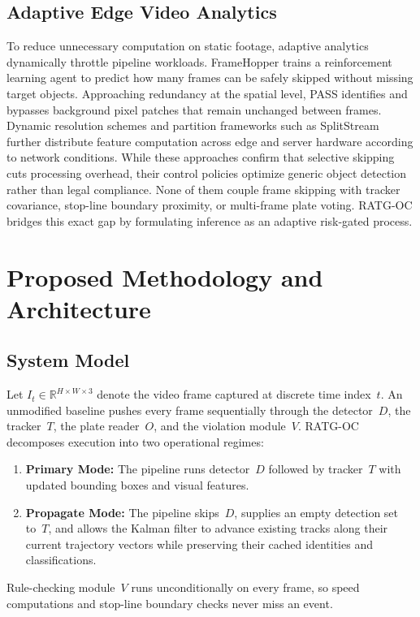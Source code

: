 \subsection{Adaptive Edge Video Analytics}
To reduce unnecessary computation on static footage, adaptive analytics dynamically throttle pipeline workloads. FrameHopper \cite{basalamah2022framehopper} trains a reinforcement learning agent to predict how many frames can be safely skipped without missing target objects. Approaching redundancy at the spatial level, PASS \cite{zhou2023pass} identifies and bypasses background pixel patches that remain unchanged between frames. Dynamic resolution schemes \cite{li2024resolution} and partition frameworks such as SplitStream \cite{splitstream2024} further distribute feature computation across edge and server hardware according to network conditions. While these approaches confirm that selective skipping cuts processing overhead, their control policies optimize generic object detection rather than legal compliance. None of them couple frame skipping with tracker covariance, stop-line boundary proximity, or multi-frame plate voting. RATG-OC bridges this exact gap by formulating inference as an adaptive risk-gated process.

\section{Proposed Methodology and Architecture}
\subsection{System Model}
Let $I_t \in \mathbb{R}^{H \times W \times 3}$ denote the video frame captured at discrete time index~$t$. An unmodified baseline pushes every frame sequentially through the detector~$D$, the tracker~$T$, the plate reader~$O$, and the violation module~$V$. RATG-OC decomposes execution into two operational regimes:
\begin{enumerate}
  \item \textbf{Primary Mode:} The pipeline runs detector~$D$ followed by tracker~$T$ with updated bounding boxes and visual features.
  \item \textbf{Propagate Mode:} The pipeline skips~$D$, supplies an empty detection set to~$T$, and allows the Kalman filter to advance existing tracks along their current trajectory vectors while preserving their cached identities and classifications.
\end{enumerate}
Rule-checking module~$V$ runs unconditionally on every frame, so speed computations and stop-line boundary checks never miss an event.

